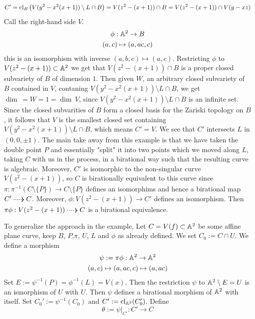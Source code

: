 \begin{example}
            $$
                C' = \mathrm{cl}_B\left(V(y^2-x^2(x+1))\setminus L\cap B\right) =  V(z^2-(x+1))\cap B = V(z^2-(x+1))\cap V(y-xz)
            $$
            Call the right-hand side $V$.
            \begin{gather*}
                \phi : \mathbb{A}^2 \rightarrow B\\
                (a,c)\mapsto (a,ac,c)
            \end{gather*}
            this is an isomorphism with inverse $(a,b,c)\mapsto (a,c)$. Restricting $\phi$ to $V(z^2-(x+1))\subset \mathbb{A}^2$ we get that $V(z^2-(x+1))\cap B$ is a proper closed subvariety of $B$ of dimension $1$. Then given $W$, an arbitrary closed subvariety of $B$ contained in $V$, contaning $V(y^2-x^2(x+1))\setminus L\cap B$, we get $\dim\ = W = 1=\dim \ V$, since $V(y^2-x^2(x+1))\setminus L\cap B$ is an infinite set. Since the closed subvarities of $B$ form a closed basis for the Zariski topology on $B$, it follows that $V$ is the smallest closed set containing $V(y^2-x^2(x+1))\setminus L\cap B$, which means $C'=V$. We see that $C'$ intersects $L$ in $(0,0,\pm 1)$. The main take away from this example is that we have taken the double point $P$ and essentially "split" it into two points which we moved along $L$, taking $C$ with us in the process, in a birational way such that the resulting curve is algebraic. Moreover, $C'$ is isomorphic to the non-singular curve $V(z^2-(x+1))$, so $C$ is birationally equivalent to this curve since $\pi : \pi^{-1}(C\setminus \{P\})\rightarrow C\setminus \{P\}$ defines an isomorphims and hence a birational map $C' \dottedarrow C$. Moreover,  $\phi: V(z^2-(x+1))\rightarrow C'$ defines an isomorphism. Then $ \pi\phi : V(z^2-(x+1))\dottedarrow C$ is a birational equivalence.   
        \end{example}
        To generalize the approach in the example, Let $C=V(f)\subset \mathbb{A}^2$ be some affine plane curve, keep $B$, $P$,$\pi$, $U$, $L$ and $\phi$ as already defined. We set $C_0 := C\cap U$. We define a morphism
        \begin{gather*}
            \psi := \pi\phi : \mathbb{A}^2 \rightarrow \mathbb{A}^2\\
            (a,c) \mapsto (a,ac,c)\mapsto (a,ac)
        \end{gather*}   
        Set $E:= \psi^{-1}(P)=\phi^{-1}(L)=V(x)$. Then the restriction $\psi$ to $\mathbb{A}^2\setminus E=U$ is an ismorphism of $U$ with $U$. Then $\psi$ defines a birational morphism of $\mathbb{A}^2$ with itself. Set $C_0' := \psi^{-1}(C_0)$ and $C' := \mathrm{cl}_{\mathbb{A}^2}(C_0')$. Define 
        $$
            \theta := \left.\psi\right|_{C'} : C'\rightarrow C 
        $$
